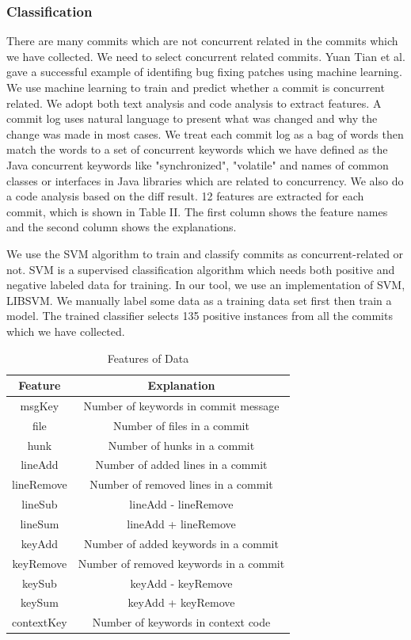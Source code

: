 \documentclass[conference]{IEEEtran}
\begin{document}
\subsubsection{Classification}
There are many commits which are not concurrent related in the commits which we have collected.  We need to select concurrent related commits. Yuan Tian et al. gave a successful example of identifing bug fixing patches using machine learning\cite{conf/icse/TianLL12}. We use machine learning to train and predict whether a commit is concurrent related. We adopt both text analysis and code analysis to extract features. A commit log uses natural language to present what was changed and why the change was made in most cases. We treat each commit log as a bag of words then match the words to a set of concurrent keywords which we have defined as the Java concurrent keywords like "synchronized", "volatile" and names of common classes or interfaces in Java libraries which are related to concurrency. We also do a code analysis based on the diff result. 12 features are extracted for each commit, which is shown in Table II. The first column shows the feature names and the second column shows the explanations.

We use the SVM\cite{journals/ml/CortesV95} algorithm to train and classify commits as concurrent-related or not. SVM is a supervised classification algorithm which needs both positive and negative labeled data for training. In our tool, we use an implementation of SVM, LIBSVM\cite{libsvm}. We manually label some data as a training data set first then train a model. The trained classifier selects 135 positive instances from all the commits which we have collected.

\begin{table}
	\centering
	\caption{Features of Data}
	\begin{tabular}{|c|c|}\hline
		Feature&Explanation\\\hline
		msgKey&Number of keywords in commit message\\\hline
		file&Number of files in a commit\\\hline
		hunk&Number of hunks in a commit\\\hline
		lineAdd&Number of added lines in a commit\\\hline
		lineRemove&Number of removed lines in a commit\\\hline
		lineSub&lineAdd - lineRemove\\\hline
		lineSum&lineAdd + lineRemove\\\hline
		keyAdd&Number of added keywords in a commit\\\hline
		keyRemove&Number of removed keywords in a commit\\\hline
		keySub&keyAdd - keyRemove\\\hline
		keySum&keyAdd + keyRemove\\\hline
		contextKey&Number of keywords in context code\\\hline
	\end{tabular}
\end{table}
\end{document}
